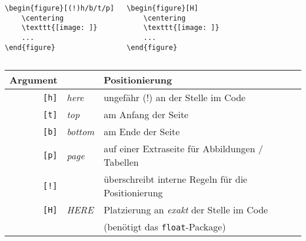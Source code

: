 \begin{frame}[fragile]
	
\vspace{0.1cm}
\begin{columns}
	\begin{lstlisting}
\begin{figure}[(!)h/b/t/p]
	\centering
	\texttt{[image: ]}
	...
\end{figure}
\end{lstlisting}
	\begin{lstlisting}
\begin{figure}[H]
	\centering
	\texttt{[image: ]}
	...
\end{figure}
	\end{lstlisting}
\end{columns}	
\vspace{-0.1cm}
	\begin{center}
		\begin{tabular}{rl|  p{6.5cm} }
			\toprule
			Argument		&&	Positionierung																			\\ \midrule
		\rule{0pt}{9pt}	 \texttt{[h]}	& \textit{here} &	ungefähr (!) an der Stelle im Code 			\\
		\rule{0pt}{9pt}	 \texttt{[t]}	& \textit{top} &	am Anfang der Seite 																\\
		\rule{0pt}{9pt}	 \texttt{[b]}	& \textit{bottom}&	am Ende der Seite 																\\
		\rule{0pt}{9pt}	 \texttt{[p]}	& \textit{page}&	auf einer Extraseite für Abbildungen / Tabellen 									\\
		\rule{0pt}{9pt}	 \texttt{[!]}	&&	überschreibt interne Regeln für die Positionierung								\\
		\rule{0pt}{9pt}	 \texttt{[H]}	 & \textit{HERE} &	Platzierung an \emph{exakt} der Stelle im Code \\
			&&(benötigt das \texttt{float}-Package)	\\
			\bottomrule
		\end{tabular}
	\end{center}
	\vspace{0.1cm}
\end{frame}